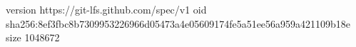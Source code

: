 version https://git-lfs.github.com/spec/v1
oid sha256:8ef3fbc8b7309953226966d05473a4e05609174fe5a51ee56a959a421109b18e
size 1048672
